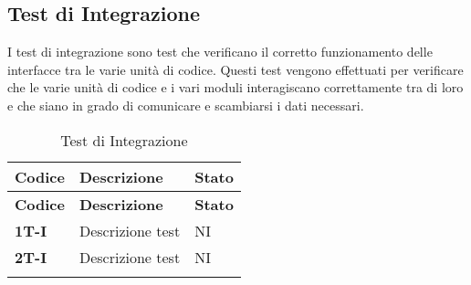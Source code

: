 \subsection{Test di Integrazione}
I test di integrazione sono test che verificano il corretto funzionamento delle interfacce tra le varie unità di codice. Questi test vengono effettuati per verificare che le varie unità di codice e i vari moduli interagiscano correttamente tra di loro e che siano in grado di comunicare e scambiarsi i dati necessari. \\
\begin{longtable}{|>{\raggedright\arraybackslash}m{}|>{\raggedright\arraybackslash}m{}|>{\raggedright\arraybackslash}m{}|}
	\hline
	\textbf{Codice} & \textbf{Descrizione} & \textbf{Stato} \\
	\hline
	\endfirsthead
	\hline
	\textbf{Codice} & \textbf{Descrizione} & \textbf{Stato} \\
	\endhead
	\textbf{1T-I}   & Descrizione test     & NI             \\
	\hline
	\textbf{2T-I}   & Descrizione test     & NI             \\
	\hline
	\caption{Test di Integrazione} %
	\label{table:13}
\end{longtable}

